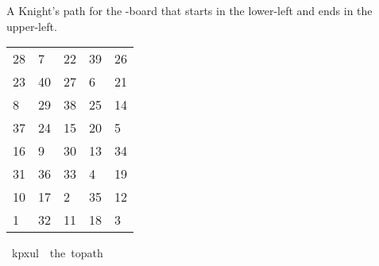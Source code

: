 \begin{isabellebody}
\begin{isamarkuptext}%
A Knight's path for the -board that starts in the lower-left and ends in the 
upper-left.
  \begin{table}[H]
    \begin{tabular}{lllll}
      28 &  7 & 22 & 39 & 26 \\
      23 & 40 & 27 &  6 & 21 \\
       8 & 29 & 38 & 25 & 14 \\
      37 & 24 & 15 & 20 &  5 \\
      16 &  9 & 30 & 13 & 34 \\
      31 & 36 & 33 &  4 & 19 \\
      10 & 17 &  2 & 35 & 12 \\
       1 & 32 & 11 & 18 &  3
    \end{tabular}
  \end{table}%
\end{isamarkuptext}\isamarkuptrue%
\isamarkupfalse%
\ {\isachardoublequoteopen}kp{}x{}ul\ {\isasymequiv}\ the\ {\isacharparenleft}{\kern0pt}to{\isacharunderscore}{\kern0pt}path\ \isanewline
\ \ {\isacharbrackleft}{\kern0pt}{\isacharbrackleft}{\kern0pt}{}{}{\isacharcomma}{\kern0pt}{}{\isacharcomma}{\kern0pt}{}{}{\isacharcomma}{\kern0pt}{}{}{\isacharcomma}{\kern0pt}{}{}{\isacharbrackright}{\kern0pt}{\isacharcomma}{\kern0pt}\isanewline
\ \ {\isacharbrackleft}{\kern0pt}{}{}{\isacharcomma}{\kern0pt}{}{}{\isacharcomma}{\kern0pt}{}{}{\isacharcomma}{\kern0pt}{}{\isacharcomma}{\kern0pt}{}{}{\isacharbrackright}{\kern0pt}{\isacharcomma}{\kern0pt}\isanewline
\ \ {\isacharbrackleft}{\kern0pt}{}{\isacharcomma}{\kern0pt}{}{}{\isacharcomma}{\kern0pt}{}{}{\isacharcomma}{\kern0pt}{}{}{\isacharcomma}{\kern0pt}{}{}{\isacharbrackright}{\kern0pt}{\isacharcomma}{\kern0pt}\isanewline
\ \ {\isacharbrackleft}{\kern0pt}{}{}{\isacharcomma}{\kern0pt}{}{}{\isacharcomma}{\kern0pt}{}{}{\isacharcomma}{\kern0pt}{}{}{\isacharcomma}{\kern0pt}{}{\isacharbrackright}{\kern0pt}{\isacharcomma}{\kern0pt}\isanewline

\end{isabellebody}
